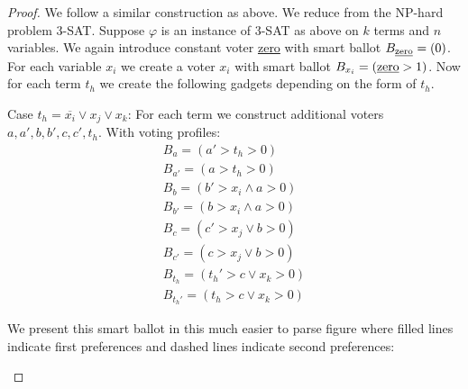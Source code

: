 \documentclass[11pt,a4paper, titlepage]{article}
\theoremstyle{definition}
\begin{document}
\begin{proof}
    We follow a similar construction as above. We reduce from the NP-hard problem \textsc{3-SAT}. Suppose $\varphi$ is an instance of \textsc{3-SAT} as above on $k$ terms and $n$ variables. We again introduce constant voter \underline{zero} with smart ballot $B_{\text{\underline{zero}}} = (0)$. For each variable $x_i$ we create a voter $x_i$ with smart ballot $B_{x_i} = (\text{\underline{zero}} > 1)$. Now for each term $t_h$ we create the following gadgets depending on the form of $t_h$.

    Case $t_h = \overline{x_i} \lor x_j \lor x_k$:
    For each term we construct additional voters $a, a', b, b', c, c', t_h$. With voting profiles: 
    \begin{align*}
        B_a = (a' > t_h > 0) \\
        B_{a'} = (a > t_h > 0) \\
        B_{b} = (b' > x_i \land a > 0) \\
        B_{b'} = (b > x_i \land a > 0) \\
        B_{c} = (c' > x_j \lor b > 0) \\
        B_{c'} = (c > x_j \lor b > 0) \\
        B_{t_h} = (t_h' > c \lor x_k > 0) \\
        B_{t_h'} = (t_h > c \lor x_k > 0)
    \end{align*}

    We present this smart ballot in this much easier to parse figure where filled lines indicate first preferences and dashed lines indicate second preferences:
    \begin{figure}[h]
        \centering

\end{figure}
\end{proof}
\end{document}
